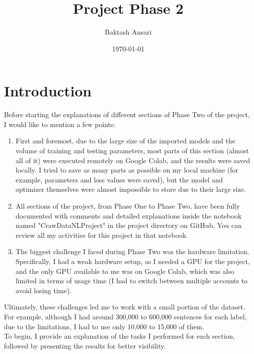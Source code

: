 \documentclass[a4paper]{article}
\title{Project Phase 2}
\author{Baktash Ansari}
\date{\today}
\begin{document}
  

\maketitle



\section{Introduction}

Before starting the explanations of different sections of Phase Two of the project, I would like to mention a few points:

\begin{enumerate}
  \item First and foremost, due to the large size of the imported models and the volume of training and testing parameters, most parts of this section (almost all of it) were executed remotely on Google Colab, and the results were saved locally. I tried to save as many parts as possible on my local machine (for example, parameters and loss values were saved), but the model and optimizer themselves were almost impossible to store due to their large size.
  \item All sections of the project, from Phase One to Phase Two, have been fully documented with comments and detailed explanations inside the notebook named "CrawDataNLProject" in the project directory on GitHub. You can review all my activities for this project in that notebook.
  \item The biggest challenge I faced during Phase Two was the hardware limitation. Specifically, I had a weak hardware setup, as I needed a GPU for the project, and the only GPU available to me was on Google Colab, which was also limited in terms of usage time (I had to switch between multiple accounts to avoid losing time).
\end{enumerate}

Ultimately, these challenges led me to work with a small portion of the dataset. For example, although I had around 300,000 to 600,000 sentences for each label, due to the limitations, I had to use only 10,000 to 15,000 of them.\\



To begin, I provide an explanation of the tasks I performed for each section, followed by presenting the results for better visibility.\\
\end{document}
